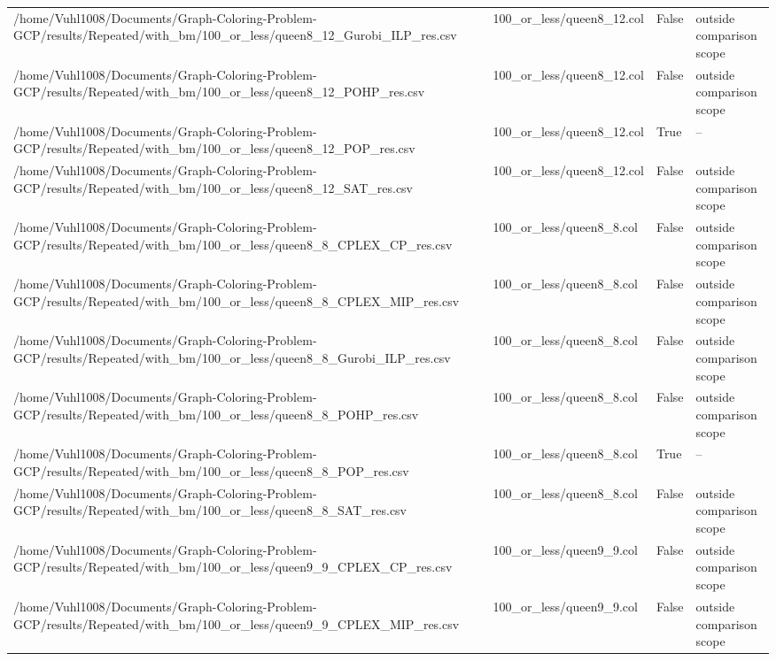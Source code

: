 \begin{table}[htbp]
\begin{tabular}{llll}
/home/Vuhl1008/Documents/Graph-Coloring-Problem-GCP/results/Repeated/with\_bm/100\_or\_less/queen8\_12\_Gurobi\_ILP\_res.csv & 100\_or\_less/queen8\_12.col & False & outside comparison scope \\
/home/Vuhl1008/Documents/Graph-Coloring-Problem-GCP/results/Repeated/with\_bm/100\_or\_less/queen8\_12\_POHP\_res.csv & 100\_or\_less/queen8\_12.col & False & outside comparison scope \\
/home/Vuhl1008/Documents/Graph-Coloring-Problem-GCP/results/Repeated/with\_bm/100\_or\_less/queen8\_12\_POP\_res.csv & 100\_or\_less/queen8\_12.col & True & -- \\
/home/Vuhl1008/Documents/Graph-Coloring-Problem-GCP/results/Repeated/with\_bm/100\_or\_less/queen8\_12\_SAT\_res.csv & 100\_or\_less/queen8\_12.col & False & outside comparison scope \\
/home/Vuhl1008/Documents/Graph-Coloring-Problem-GCP/results/Repeated/with\_bm/100\_or\_less/queen8\_8\_CPLEX\_CP\_res.csv & 100\_or\_less/queen8\_8.col & False & outside comparison scope \\
/home/Vuhl1008/Documents/Graph-Coloring-Problem-GCP/results/Repeated/with\_bm/100\_or\_less/queen8\_8\_CPLEX\_MIP\_res.csv & 100\_or\_less/queen8\_8.col & False & outside comparison scope \\
/home/Vuhl1008/Documents/Graph-Coloring-Problem-GCP/results/Repeated/with\_bm/100\_or\_less/queen8\_8\_Gurobi\_ILP\_res.csv & 100\_or\_less/queen8\_8.col & False & outside comparison scope \\
/home/Vuhl1008/Documents/Graph-Coloring-Problem-GCP/results/Repeated/with\_bm/100\_or\_less/queen8\_8\_POHP\_res.csv & 100\_or\_less/queen8\_8.col & False & outside comparison scope \\
/home/Vuhl1008/Documents/Graph-Coloring-Problem-GCP/results/Repeated/with\_bm/100\_or\_less/queen8\_8\_POP\_res.csv & 100\_or\_less/queen8\_8.col & True & -- \\
/home/Vuhl1008/Documents/Graph-Coloring-Problem-GCP/results/Repeated/with\_bm/100\_or\_less/queen8\_8\_SAT\_res.csv & 100\_or\_less/queen8\_8.col & False & outside comparison scope \\
/home/Vuhl1008/Documents/Graph-Coloring-Problem-GCP/results/Repeated/with\_bm/100\_or\_less/queen9\_9\_CPLEX\_CP\_res.csv & 100\_or\_less/queen9\_9.col & False & outside comparison scope \\
/home/Vuhl1008/Documents/Graph-Coloring-Problem-GCP/results/Repeated/with\_bm/100\_or\_less/queen9\_9\_CPLEX\_MIP\_res.csv & 100\_or\_less/queen9\_9.col & False & outside comparison scope \\

\end{tabular}
\end{table}
